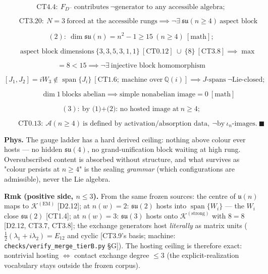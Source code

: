 \documentclass[11pt,openany]{report}
\theoremstyle{canonplain}
\theoremstyle{canondef}
\begin{document}
\[
\mathrm{CT4.4}:\ F_{D^-}\ \text{contributes}\ \neg\text{generator to any accessible algebra};
\]

\[
\qquad \mathrm{CT3.20}:\ N=3\ \text{forced at the accessible rungs}\implies\neg\exists\ \mathfrak{su}(n\ge4)\ \text{aspect block}
\]

\[
(2):\ \dim\mathfrak{su}(n)=n^2-1\ge15\ (n\ge4)\ [\text{math}];
\]

\[
\qquad \text{aspect block dimensions}\ \{3,3,5,3,1,1\}\ [\mathrm{CT0.12}]\ \cup\ \{8\}\ [\mathrm{CT3.8}]\implies\max
\]

\[
= 8<15\implies\neg\exists\ \text{injective block homomorphism}
\]

\[
[J_1,J_2]=iW_3\notin\operatorname{span}\{J_i\}\ [\mathrm{CT1.6};\ \text{machine over}\ \mathbb Q(i)]\implies J\text{-spans}\ \neg\text{Lie-closed};
\]

\[
\qquad \dim1\ \text{blocks abelian}\implies\text{simple nonabelian image}=0\ [\text{math}]
\]

\[
(3):\ \text{by (1)+(2): no hosted image at}\ n\ge4;
\]

\[
\qquad \mathrm{CT0.13}:\ \mathcal A(n\ge4)\ \text{is defined by activation/absorption data},\ \neg\text{by}\ \iota_n\text{-images}.\ \blacksquare
\]

\textbf{Phys.} The gauge ladder has a hard derived ceiling: nothing above colour ever hosts — no hidden $\mathfrak{su}(4)$, no grand-unification block waiting at high rung. Oversubscribed content is absorbed without structure, and what survives as "colour persists at $n\ge4$" is the sealing \textit{grammar} (which configurations are admissible), never the Lie algebra.

\textbf{Rmk (positive side, $n\le3$).} From the same frozen sources: the centre of $\mathfrak u(n)$ maps to $\mathcal K^{(\mathrm{EM})}$ [D2.12]; at $n(w)=2$: $\mathfrak{su}(2)$ hosts into $\operatorname{span}\{W_i\}$ — the $W_i$ close $\mathfrak{su}(2)$ [CT1.4]; at $n(w)=3$: $\mathfrak{su}(3)$ hosts onto $\mathcal K^{(\mathrm{strong})}$ with $8=8$ [D2.12, CT3.7, CT3.8]; the exchange generators host \textit{literally} as matrix units ($\tfrac12(\lambda_1+i\lambda_2)=E_{12}$ and cyclic [CT3.9's basis; machine: \texttt{checks/\allowbreak{}verify\_\allowbreak{}merge\_\allowbreak{}tierB.py} §G]). The hosting ceiling is therefore exact: nontrivial hosting $\iff$ contact exchange degree $\le3$ (the explicit-realization vocabulary stays outside the frozen corpus).
\end{document}
